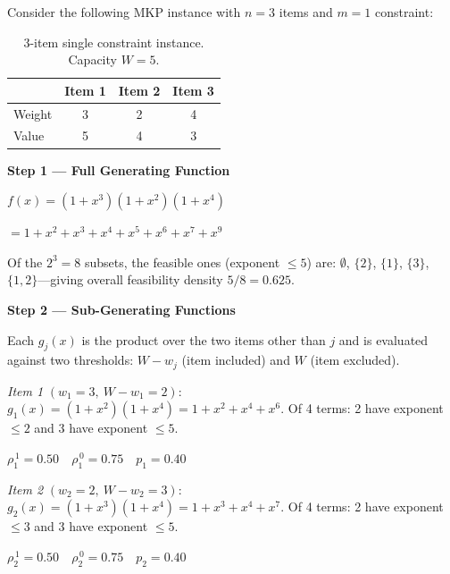 \documentclass[twocolumn]{article}
\begin{document}
Consider the following MKP instance with $n = 3$ items 
and $m = 1$ constraint:

\begin{table}[H]
\centering
\begin{tabular}{lccc}
\toprule
 & Item 1 & Item 2 & Item 3 \\
\midrule
Weight & 3 & 2 & 4 \\
Value  & 5 & 4 & 3 \\
\bottomrule
\end{tabular}
\caption{3-item single constraint instance. Capacity $W = 5$.}
\end{table}

\noindent \textbf{Step 1 --- Full Generating Function}

\begin{flushleft}
\hspace{2em}$f(x) = (1 + x^3)(1 + x^2)(1 + x^4)$
\end{flushleft}
\begin{flushleft}
\hspace{2em}$= 1 + x^2 + x^3 + x^4 + x^5 + x^6 + x^7 + x^9$
\end{flushleft}

Of the $2^3 = 8$ subsets, the feasible ones (exponent $\leq 5$) are: 
$\emptyset$, $\{2\}$, $\{1\}$, $\{3\}$, $\{1,2\}$---giving 
overall feasibility density $5/8 = 0.625$.

\noindent \textbf{Step 2 --- Sub-Generating Functions}

Each $g_j(x)$ is the product over the two items other than $j$ and is 
evaluated against two thresholds: $W - w_j$ (item included) and $W$ 
(item excluded).

\vspace{0.5em}
\noindent \textit{Item 1} $(w_1 = 3,\ W - w_1 = 2)$:
$g_1(x) = (1 + x^2)(1 + x^4) = 1 + x^2 + x^4 + x^6$. 
Of 4 terms: 2 have exponent $\leq 2$ and 3 have exponent $\leq 5$.

\begin{flushleft}
\hspace{2em}$\rho_{1}^{\,1} = 0.50 \quad 
\rho_{1}^{\,0} = 0.75 \quad
p_1 = 0.40$
\end{flushleft}

\noindent \textit{Item 2} $(w_2 = 2,\ W - w_2 = 3)$:
$g_2(x) = (1 + x^3)(1 + x^4) = 1 + x^3 + x^4 + x^7$. 
Of 4 terms: 2 have exponent $\leq 3$ and 3 have exponent $\leq 5$.

\begin{flushleft}
\hspace{2em}$\rho_{2}^{\,1} = 0.50 \quad 
\rho_{2}^{\,0} = 0.75 \quad
p_2 = 0.40$
\end{flushleft}
\end{document}
